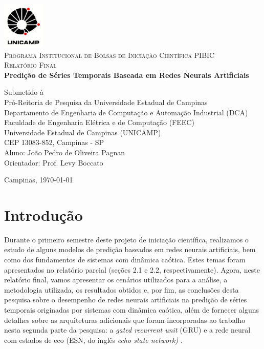 \documentclass[a4paper, 12pt]{article}
\begin{document}
\begin{titlepage}
\newcommand{\HRule}{\rule{\linewidth}{1.5mm}}
	
\center

\includegraphics[width=0.15\textwidth]{logo-unicamp.pdf}\\[1.0cm]

\textsc{\Large Programa Institucional de Bolsas de Iniciação Científica PIBIC}\\[0.5cm]

\textsc{\large Relatório Final}\\[1.5cm]

{\Large \bfseries Predição de Séries Temporais Baseada em Redes Neurais Artificiais}\\[2.5cm]

\begin{flushleft}
Submetido à \\ Pró-Reitoria de Pesquisa da Universidade Estadual de Campinas\\[1.5cm]

Departamento de Engenharia de Computação e Automação Industrial (DCA)\\
Faculdade de Engenharia Elétrica e de Computação (FEEC)\\
Universidade Estadual de Campinas (UNICAMP)\\
CEP 13083-852, Campinas - SP\\[1.0cm]

Aluno: João Pedro de Oliveira Pagnan\\
Orientador: Prof. Levy Boccato \\[4.5cm]
\end{flushleft}	
	
Campinas, \today

\end{titlepage}

\newpage

\section{Introdução}

Durante o primeiro semestre deste projeto de iniciação científica, realizamos o estudo de alguns modelos de predição baseados em redes neurais artificiais, bem como dos fundamentos de sistemas com dinâmica caótica. Estes temas foram apresentados no relatório parcial (seções 2.1 e 2.2, respectivamente). Agora, neste relatório final, vamos apresentar os cenários utilizados para a análise, a metodologia utilizada, os resultados obtidos e, por fim, as conclusões desta pesquisa sobre o desempenho de redes neurais artificiais na predição de séries temporais originadas por sistemas com dinâmica caótica, além de fornecer alguns detalhes sobre as arquiteturas adicionais que foram incorporadas ao trabalho nesta segunda parte da pesquisa: a \textit{gated recurrent unit} (GRU) \cite{cho2014learning} e a rede neural com estados de eco (ESN, do inglês \textit{echo state network)} \cite{jaeger2007echo}.
\end{document}
